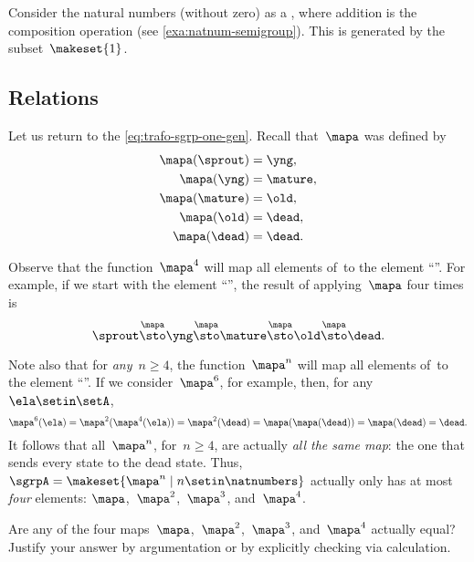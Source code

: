 \begin{example}
    Consider the natural numbers (without zero) as a   , where addition is the  composition operation (see \cref{exa:natnum-semigroup}).
    This  is generated by the subset~$\makeset{1 }$.
\end{example}

\subsection{Relations}

Let us return to the  \cref{eq:trafo-sgrp-one-gen}.
Recall that~$\mapa$ was defined by
%
\begin{align}
    \mapa(\sprout) & =  \yng, \\
    \mapa(\yng)    & =  \mature, \\
    \mapa(\mature) & =  \old, \\
    \mapa( \old)   & = \dead, \\
    \mapa(\dead)   & = \dead.
\end{align}

Observe that the function~$\mapa^4$ will map all elements of~\setA to the element ``\dead''.
For example, if we start with the element ``\sprout'', the result of applying~$\mapa$ four times is
%
\begin{equation}
    \sprout \overset{\mapa}{\sto} \yng \overset{\mapa}{\sto} \mature \overset{\mapa}{\sto} \old \overset{\mapa}{\sto} \dead.
\end{equation}

Note also that for \emph{any}~$n \geq 4$, the function~$\mapa^n$ will map all elements of~\setA to the element ``\dead''.
If we consider~$\mapa^6$, for example, then, for any~$\ela \setin \setA$,
%
\begin{equation}
    \mapa^6(\ela) = \mapa^2(\mapa^4(\ela)) = \mapa^2(\dead) = \mapa(\mapa(\dead)) = \mapa(\dead) = \dead.
\end{equation}
%
It follows that all~$\mapa^n$, for~$n \geq 4$, are actually \emph{all the same map}: the one that sends every state to the dead state.
Thus, ~$\sgrpA = \makeset{ \mapa^n \mid n \setin \natnumbers }$ actually only has at most \emph{four} elements: $\mapa$,~$\mapa^2$,~$\mapa^3$, and~$\mapa^4$.

\begin{gradedexercise}
    \label{ex:CheckRelations}
    Are any of the four maps~$\mapa$,~$\mapa^2$,~$\mapa^3$, and~$\mapa^4$ actually equal?
    Justify your answer by argumentation or by explicitly checking via calculation.
\end{gradedexercise}

